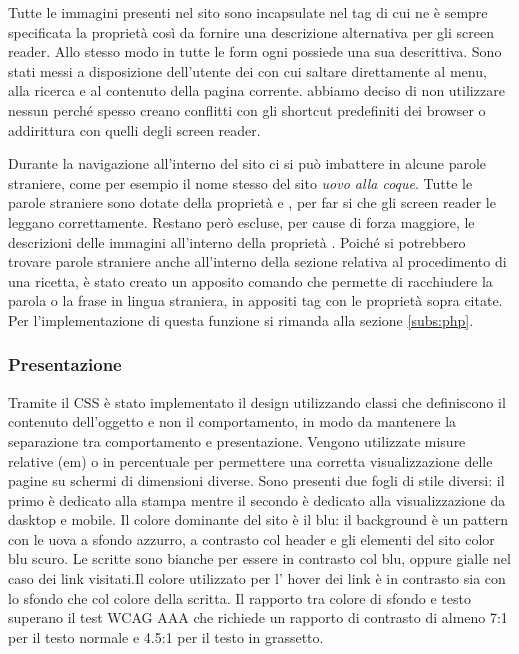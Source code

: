 Tutte le immagini presenti nel sito sono incapsulate nel tag  di cui ne è sempre specificata la proprietà  così da fornire una descrizione alternativa per gli screen reader. Allo stesso modo in tutte le form ogni  possiede una sua  descrittiva. Sono stati messi a disposizione dell'utente dei  con cui saltare direttamente al menu, alla ricerca e al contenuto della pagina corrente. abbiamo deciso di non utilizzare nessun  perché spesso creano conflitti con gli shortcut predefiniti dei browser o addirittura con quelli degli screen reader.

Durante la navigazione all'interno del sito ci si può imbattere in alcune parole straniere, come per esempio il nome stesso del sito \emph{uovo alla coque}. Tutte le parole straniere sono dotate della proprietà  e , per far si che gli screen reader le leggano correttamente. Restano però escluse, per cause di forza maggiore, le descrizioni delle immagini all'interno della proprietà . Poiché si potrebbero trovare parole straniere anche all'interno della sezione relativa al procedimento di una ricetta, è stato creato un apposito comando che permette di racchiudere la parola o la frase in lingua straniera, in appositi tag con le proprietà sopra citate. Per l'implementazione di questa funzione si rimanda alla sezione \ref{subs:php}.

\subsubsection{Presentazione}
Tramite il CSS è stato implementato il design utilizzando classi che definiscono il contenuto dell'oggetto e non il comportamento, in modo da mantenere la separazione tra comportamento e presentazione. Vengono utilizzate misure relative (em) o in percentuale per permettere una corretta visualizzazione delle pagine su schermi di dimensioni diverse. Sono presenti due fogli di stile diversi: il primo è dedicato alla stampa mentre il secondo è dedicato alla visualizzazione da dasktop e mobile.
Il colore dominante del sito è il blu: il background è un pattern con le uova a sfondo azzurro, a contrasto col header e gli elementi del sito color blu scuro. Le scritte sono bianche per essere in contrasto col blu, oppure gialle nel caso dei link visitati.Il colore utilizzato per l' hover dei link è in contrasto sia con lo sfondo che col colore della scritta. Il rapporto tra colore di sfondo e testo superano il test WCAG AAA che richiede un rapporto di contrasto di almeno 7:1 per il testo normale e 4.5:1 per il testo in grassetto.

